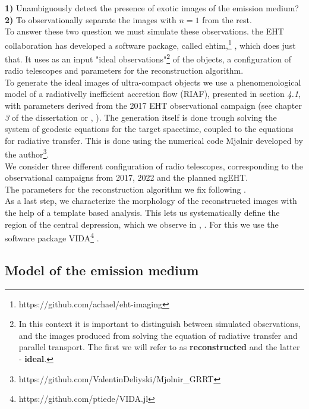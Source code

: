 \documentclass[12pt]{article}
\numberwithin{equation}{section}
\numberwithin{figure}{section}
\begin{document}
	\textbf{1)} Unambiguously detect the presence of exotic images of the emission medium?\\
	
	\textbf{2)} To observationally separate the images with $n = 1$ from the rest.\\
	
	To answer these two question we must simulate these observations. the EHT collaboration has developed a software package, called ehtim,\footnote{https://github.com/achael/eht-imaging} \cite{EHTIM}, which does just that. It uses as an input "ideal observations"\footnote{In this context it is important to distinguish between simulated observations, and the images produced from solving the equation of radiative transfer and parallel transport. The first we will refer to as \textbf{reconstructed} and the latter - \textbf{ideal}.} of the objects, a configuration of radio telescopes and parameters for the reconstruction algorithm.\\
	
	To generate the ideal images of ultra-compact objects we use a phenomenological model of a radiativelly inefficient accretion flow (RIAF), presented in section \emph{4.1}, with parameters derived from the 2017 EHT observational campaign (see chapter \emph{3} of the dissertation or \cite{EHT_M87_V}, \cite{EHT_M87_VIII}). The generation itself is done trough solving the system of geodesic equations for the target spacetime, coupled to the equations for radiative transfer. This is done using the numerical code Mjølnir developed by the author\footnote{https://github.com/ValentinDeliyski/Mjolnir\_GRRT}.\\
	
	\noindent We consider three different configuration of radio telescopes, corresponding to the observational campaigns from 2017, 2022 and the planned ngEHT.\\
	
	\noindent The parameters for the reconstruction algorithm we fix following \cite{EHTIM}.\\
	
	\noindent As a last step, we characterize the morphology of the reconstructed images with the help of a template based analysis. This lets us systematically define the region of the central depression, which we observe in \cite{EHT_M87_I}, \cite{EHT_SGR_I}. For this we use the software package VIDA\footnote{https://github.com/ptiede/VIDA.jl} \cite{VIDA}.
	
	
	\subsection{Model of the emission medium}
	
\end{document}
